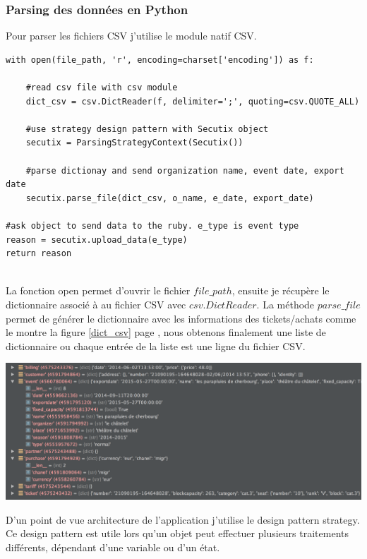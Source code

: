 \subsubsection{Parsing des données en Python}
Pour parser les fichiers CSV j'utilise le module natif CSV.
\\


\lstset{style=custompython}
\begin{lstlisting}
with open(file_path, 'r', encoding=charset['encoding']) as f:

	#read csv file with csv module
	dict_csv = csv.DictReader(f, delimiter=';', quoting=csv.QUOTE_ALL)
	
	#use strategy design pattern with Secutix object
	secutix = ParsingStrategyContext(Secutix())	
	
	#parse dictionay and send organization name, event date, export date
	secutix.parse_file(dict_csv, o_name, e_date, export_date)

#ask object to send data to the ruby. e_type is event type 
reason = secutix.upload_data(e_type)
return reason
\end{lstlisting}

\leavevmode \\
La fonction open permet d'ouvrir le fichier $file\_path$, ensuite je récupère le dictionnaire associé à au fichier CSV avec $csv.DictReader$. La méthode $parse\_file$ permet de générer le dictionnaire avec les informations des tickets/achats comme le montre la figure \ref{dict_csv} page \pageref{dict_csv}, nous obtenons finalement une liste de dictionnaire ou chaque entrée de la liste est une ligne du fichier CSV. 

\begin{center}
\includegraphics[scale=0.45]{Images/dict_tickets.png}
\label{dict_csv}
\end{center}


D'un point de vue architecture de l'application j'utilise le design pattern strategy. Ce design pattern est utile lors qu'un objet peut effectuer plusieurs traitements différents, dépendant d'une variable ou d'un état.

